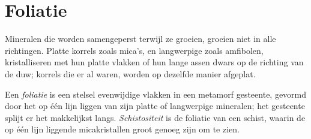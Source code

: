 \section{Foliatie}\label{sec:g12:metamorphic-rocks:foliation}

Mineralen die worden samengeperst terwijl ze groeien, groeien niet in alle richtingen. Platte
korrels zoals mica's, en langwerpige zoals amfibolen, kristalliseren met
hun platte vlakken of hun lange assen dwars op de richting van de duw; korrels die er al waren, worden op dezelfde
manier afgeplat.

\begin{definition}\label{def:g12:metamorphic-rocks:foliation}
Een \emph{foliatie} is een stelsel evenwijdige vlakken in een
metamorf gesteente, gevormd door het op één lijn liggen van zijn platte of langwerpige mineralen;
het gesteente splijt er het makkelijkst langs. \emph{Schistositeit}
is de foliatie van een schist, waarin de op één lijn liggende micakristallen groot
genoeg zijn om te zien.
\end{definition}

